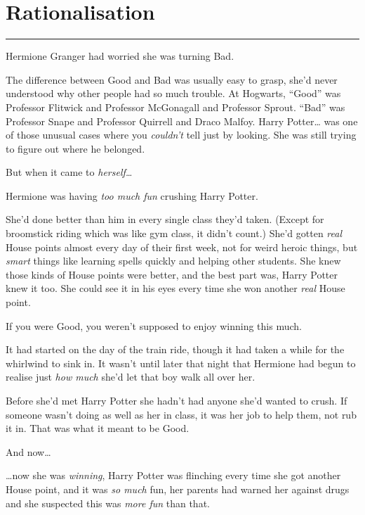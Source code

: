 \chapter{Rationalisation}

\begin{center}\rule{3in}{0.4pt}\end{center}

Hermione Granger had worried she was turning Bad.

The difference between Good and Bad was usually easy to grasp, she'd
never understood why other people had so much trouble. At Hogwarts,
``Good'' was Professor Flitwick and Professor McGonagall and Professor
Sprout. ``Bad'' was Professor Snape and Professor Quirrell and Draco
Malfoy. Harry Potter\ldots{} was one of those unusual cases where you
\emph{couldn't} tell just by looking. She was still trying to figure out
where he belonged.

But when it came to \emph{herself\ldots{}}

Hermione was having \emph{too much fun} crushing Harry Potter.

She'd done better than him in every single class they'd taken. (Except
for broomstick riding which was like gym class, it didn't count.) She'd
gotten \emph{real} House points almost every day of their first week,
not for weird heroic things, but \emph{smart} things like learning
spells quickly and helping other students. She knew those kinds of House
points were better, and the best part was, Harry Potter knew it too. She
could see it in his eyes every time she won another \emph{real} House
point.

If you were Good, you weren't supposed to enjoy winning this much.

It had started on the day of the train ride, though it had taken a while
for the whirlwind to sink in. It wasn't until later that night that
Hermione had begun to realise just \emph{how much} she'd let that boy
walk all over her.

Before she'd met Harry Potter she hadn't had anyone she'd wanted to
crush. If someone wasn't doing as well as her in class, it was her job
to help them, not rub it in. That was what it meant to be Good.

And now\ldots{}

\ldots{}now she was \emph{winning}, Harry Potter was flinching every
time she got another House point, and it was \emph{so much} fun, her
parents had warned her against drugs and she suspected this was
\emph{more fun} than that.

